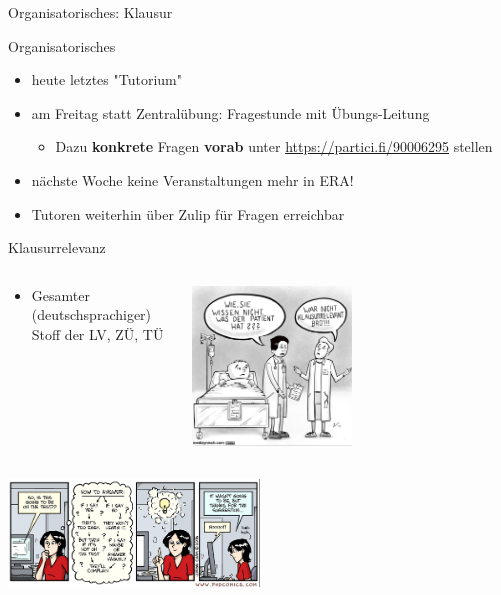 \documentclass[
  german,            %
  aspectratio=169,    %
]{tumbeamer}
\begin{document}
\begin{frame}[c]{}{}
	\begin{center}
	  \LARGE Organisatorisches: Klausur
	\end{center}
\end{frame}

\begin{frame}[c]{Organisatorisches}{}
	\begin{itemize}
		\item heute letztes "Tutorium"
		\item am Freitag statt Zentralübung: Fragestunde mit Übungs-Leitung
		\begin{itemize}
			\item Dazu \textbf{konkrete} Fragen \textbf{vorab} unter \href{https://partici.fi/90006295}{https://partici.fi/90006295} stellen
		\end{itemize}
		\item nächste Woche keine Veranstaltungen mehr in ERA!
		\item Tutoren weiterhin über Zulip für Fragen erreichbar
	\end{itemize}
\end{frame}

\begin{frame}[c]{Klausurrelevanz}{}
	\begin{columns}[c]
		\begin{column}{0.5\textwidth}
			\begin{itemize}
				\item Gesamter (deutschsprachiger) Stoff der LV, ZÜ, TÜ
			\end{itemize}
		\end{column}
		\begin{column}{0.5\textwidth}
			\centering
			\includegraphics[width=0.5\textwidth]{w14_klausurrelevanz_1_vl.png}
		\end{column}
	\end{columns}
	\centering
	\includegraphics[width=0.5\textwidth]{w14_klausurrelevanz_2_vl.png}
\end{frame}
\end{document}
